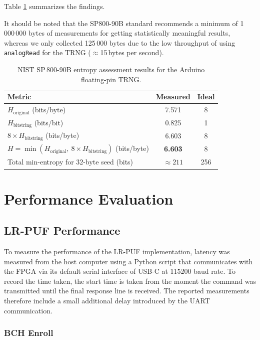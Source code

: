 Table \ref{tab:trng-results} summarizes the findings.

It should be noted that the SP800-90B standard recommends a minimum of 1\,000\,000 bytes of measurements for getting statistically meaningful results, whereas we only collected 125\,000 bytes due to the low throughput of using \texttt{analogRead} for the TRNG ($\approx$15\,bytes per second).

\begin{table}[h]
\centering
\caption{NIST SP\,800-90B entropy assessment results for the Arduino floating-pin TRNG.}
\begin{tabular}{lcc}
\hline
\textbf{Metric} & \textbf{Measured} & \textbf{Ideal} \\
\hline
$H_\text{original}$ (bits/byte) & 7.571 & 8 \\
$H_\text{bitstring}$ (bits/bit) & 0.825 & 1 \\
$8 \times H_\text{bitstring}$ (bits/byte) & 6.603 & 8 \\
$H = \min(H_\text{original},\ 8 \times H_\text{bitstring})$ (bits/byte) & \textbf{6.603} & 8 \\
Total min-entropy for 32-byte seed (bits) & $\approx 211$ & 256 \\
\hline
\end{tabular}
\label{tab:trng-results}
\end{table}

\section{Performance Evaluation}
\subsection{LR-PUF Performance}
To measure the performance of the LR-PUF implementation, latency was measured from the host computer using a Python script that communicates with the FPGA via its default serial interface of USB-C at 115200 baud rate. To record the time taken, the start time is taken from the moment the command was transmitted until the final response line is received. The reported measurements therefore include a small additional delay introduced by the UART communication.

\subsubsection{BCH Enroll}

